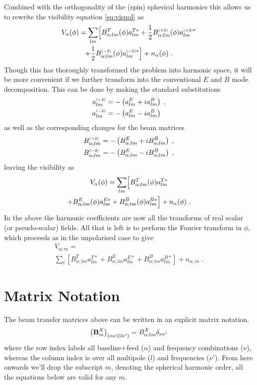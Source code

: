 \documentclass[prd,twocolumn,nofootinbib]{revtex4}
\begin{document}
Combined with the orthogonality of the (spin) spherical harmonics this
allows us to rewrite the visibility equation \eqref{eq:vispol} as
\begin{multline}
V_{\alpha}(\phi) = \sum_{lm} \Bigl[B_{\alpha;lm}^T(\phi) a^{T*}_{lm} +
\frac{1}{2} B_{\alpha;lm}^{\scriptscriptstyle \left(+2\right)}(\phi) a^{{\scriptscriptstyle \left(+2\right)}*}_{lm} \\+
\frac{1}{2} B_{\alpha;lm}^{\scriptscriptstyle \left(-2\right)}(\phi) a^{{\scriptscriptstyle \left(-2\right)}*}_{lm}\Bigr] + n_{\alpha}(\phi)
\; .
\end{multline}
Though this has thoroughly transformed the problem into harmonic
space, it will be more convenient if we further transform into the
conventional $E$ and $B$ mode decomposition. This can be done by
making the standard substitutions
\begin{align}
a^{\scriptscriptstyle \left(+2\right)}_{lm} & = -\left(a^E_{lm} + i a^B_{lm}\right) \; ,\\
a^{\scriptscriptstyle \left(-2\right)}_{lm} & = -\left(a^E_{lm} - i a^B_{lm}\right)
\end{align}
as well as the corresponding changes for the beam matrices
\begin{align}
  B^{\scriptscriptstyle \left(+2\right)}_{\alpha;lm} & = -\left(B^E_{\alpha;lm} + i B^B_{\alpha;lm}\right) \; ,\\
  B^{\scriptscriptstyle \left(-2\right)}_{\alpha;lm} & = -\left(B^E_{\alpha;lm} - i B^B_{\alpha;lm}\right)
  \; ,
\end{align}
leaving the visibility as
\begin{multline}
V_{\alpha}(\phi) = \sum_{lm} \Bigl[B_{\alpha;lm}^T(\phi) a^{T*}_{lm} \\+
B_{\alpha;lm}^E(\phi) a^{E*}_{lm} + B_{\alpha;lm}^B(\phi)
a^{B*}_{lm}\Bigr] + n_{\alpha}(\phi)
\; .
\end{multline}
In the above the harmonic coefficients are now all the transforms of real scalar
(or pseudo-scalar) fields. All that is left is to perform the Fourier transform
in $\phi$, which proceeds as in the unpolarised case to give
\begin{multline}
V_{\alpha; m} =\\ \sum_{l} \left[B_{\alpha;lm}^T a^{T*}_{lm} +
B_{\alpha;lm}^E a^{E*}_{lm} + B_{\alpha;lm}^B
a^{B*}_{lm}\right] + n_{\alpha; m}
\; .
\end{multline}




\section{Matrix Notation}

The beam transfer matrices above can be written in an explicit matrix notation.
\begin{equation}
\left(\mathbf{B}_m^X\right)_{(\alpha \nu) (l \nu')} = B_{\alpha;lm}^X \delta_{\nu \nu'}
\end{equation}
where the row index labels all baseline+feed ($\alpha$) and frequency
combinations ($\nu$), whereas the column index is over all multipole ($l$) and
frequencies ($\nu'$). From here onwards we'll drop the subscript $m$, denoting
the spherical harmonic order, all the equations below are valid for any $m$.
\end{document}

